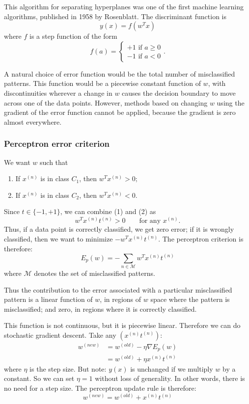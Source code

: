 \documentclass[a4paper,12pt]{article}
\begin{document}
This algorithm for separating hyperplanes was one of the first machine learning algorithms, published in 1958 by Rosenblatt. The discriminant function is
$$y(x) = f(w^Tx)$$
where $f$ is a step function of the form 
$$f(a) = \begin{cases}
+1 \text{ if } a\geq0 \\
-1 \text{ if } a < 0 
\end{cases}.$$

A natural choice of error function would be the total number of misclassified patterns. This function would be a piecewise constant function of $w$, with discontinuities wherever a change in $w$ causes the decision boundary to move across one of the data points. However, methods based on changing $w$ using the gradient of the error function cannot be applied, because the gradient is zero almost everywhere. 

\subsubsection{Perceptron error criterion}

We want $w$ such that 
\begin{enumerate}
\item
If $x^{(n)}$ is in class $C_1$, then $w^Tx^{(n)} > 0;$
\item
If $x^{(n)}$ is in class $C_2$, then $w^Tx^{(n)} < 0.$
\end{enumerate}
Since $t \in \{-1, +1\}$, we can combine (1) and (2) as
$$w^T x^{(n)} t^{(n)} > 0\qquad \text{for any } x^{(n)}.$$
Thus, if a data point is correctly classified, we get zero error; if it is wrongly classified, then we want to minimize $-w^T x^{(n)} t^{(n)}$. The perceptron criterion is therefore: 
$$E_p(w) = -\sum_{n\in \mathcal{M}} w^Tx^{(n)}t^{(n)}$$
where $\mathcal{M}$ denotes the set of misclassified patterns. 

Thus the contribution to the error associated with a particular misclassified pattern is a linear function of $w$, in regions of $w$ space where the pattern is misclassified; and zero, in regions where it is correctly classified. 

This function is not continuous, but it is piecewise linear. Therefore we can do stochastic gradient descent. Take any $(x^{(n)}t^{(n)})$: 
\begin{align*}
w^{(new)} &= w^{(old)} - \eta \nabla E_p(w)\\
  &= w^{(old)} + \eta x^{(n)}t^{(n)}
\end{align*}
where $\eta$ is the step size. But note: $y(x)$ is unchanged if we multiply $w$ by a constant. So we can set $\eta = 1$ without loss of generality. In other words, there is no need for a step size. The perceptron update rule is therefore: 
$$w^{(new)} = w^{(old)} + x^{(n)}t^{(n)}$$
\end{document}
